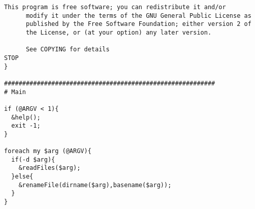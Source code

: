 \begin{lstlisting}[style=archivo]
      This program is free software; you can redistribute it and/or
      modify it under the terms of the GNU General Public License as
      published by the Free Software Foundation; either version 2 of
      the License, or (at your option) any later version.
      
      See COPYING for details
STOP
}

##########################################################
# Main

if (@ARGV < 1){
  &help();
  exit -1;
}

foreach my $arg (@ARGV){
  if(-d $arg){
    &readFiles($arg);
  }else{
    &renameFile(dirname($arg),basename($arg));  
  }
}
\end{lstlisting}

